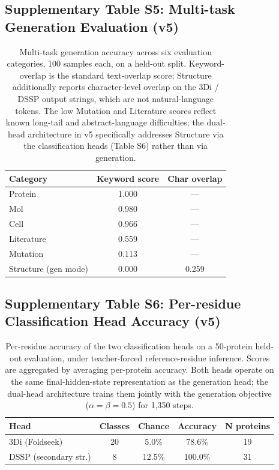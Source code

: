 \documentclass[11pt]{article}
\begin{document}
\subsection{Supplementary Table S5: Multi-task Generation Evaluation (v5)}

\begin{table}[H]
\centering
\caption{Multi-task generation accuracy across six evaluation categories, 100 samples each, on a held-out split. Keyword-overlap is the standard text-overlap score; Structure additionally reports character-level overlap on the 3Di / DSSP output strings, which are not natural-language tokens. The low Mutation and Literature scores reflect known long-tail and abstract-language difficulties; the dual-head architecture in v5 specifically addresses Structure via the classification heads (Table S6) rather than via generation.}
\begin{tabular}{lcc}
\toprule
\textbf{Category} & \textbf{Keyword score} & \textbf{Char overlap} \\
\midrule
Protein     & 1.000 & --- \\
Mol         & 0.980 & --- \\
Cell        & 0.966 & --- \\
Literature  & 0.559 & --- \\
Mutation    & 0.113 & --- \\
Structure (gen mode) & 0.000 & 0.259 \\
\bottomrule
\end{tabular}
\end{table}

\subsection{Supplementary Table S6: Per-residue Classification Head Accuracy (v5)}

\begin{table}[H]
\centering
\caption{Per-residue accuracy of the two classification heads on a 50-protein held-out evaluation, under teacher-forced reference-residue inference. Scores are aggregated by averaging per-protein accuracy. Both heads operate on the same final-hidden-state representation as the generation head; the dual-head architecture trains them jointly with the generation objective ($\alpha = \beta = 0.5$) for 1{,}350 steps.}
\begin{tabular}{lcccc}
\toprule
\textbf{Head} & \textbf{Classes} & \textbf{Chance} & \textbf{Accuracy} & \textbf{N proteins} \\
\midrule
3Di (Foldseek)        & 20 & 5.0\%  & 78.6\%  & 19 \\
DSSP (secondary str.) & 8  & 12.5\% & 100.0\% & 31 \\
\bottomrule
\end{tabular}
\end{table}
\end{document}

